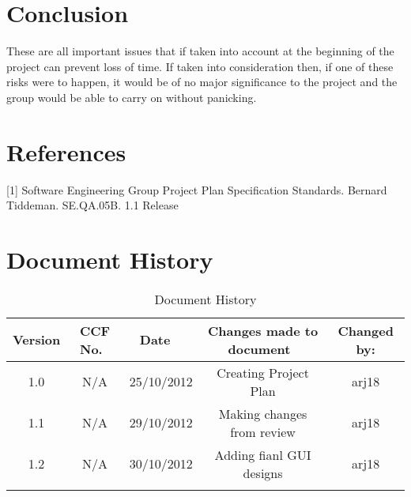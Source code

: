 \documentclass[titlepage]{article}
\begin{document}
\section{Conclusion}These are all important issues that if taken into account at the beginning of the project can prevent loss of time. If taken into consideration then, if one of these risks were to happen, it would be of no major significance to the project and the group would be able to carry on without panicking.
\newline
\section{References}
[1] Software Engineering Group Project Plan Specification Standards.  Bernard Tiddeman. SE.QA.05B. 1.1 Release
\newline
\section{Document History}
\begin{table*}[h]
\caption{Document History}
\centering
\begin{tabular}{c|c|c|c|c}
\hline\hline
Version & CCF No.\ & Date \ & Changes made to document\ & Changed by: \\ [0.5ex]
\hline
1.0 & N/A & 25/10/2012 & Creating Project Plan & arj18 \\
\hline
1.1 & N/A  & 29/10/2012 & Making changes from review & arj18 \\
\hline
1.2 & N/A  & 30/10/2012  & Adding fianl GUI designs & arj18 \\
\hline
 &  &  &  \\ [1ex]	
\hline 
\end{tabular}
\label{table:nonlin}
\end{table*}
\end{document}
